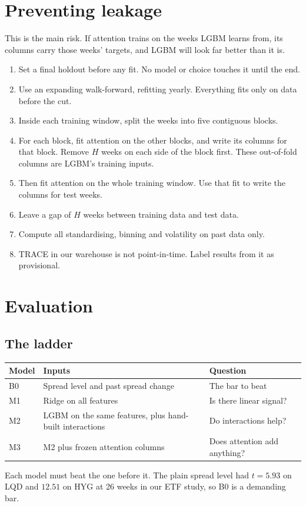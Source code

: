 \documentclass[11pt]{article}
\begin{document}
\section{Preventing leakage}
This is the main risk. If attention trains on the weeks LGBM learns from, its columns carry those weeks' targets, and LGBM will look far better than it is.

\begin{enumerate}
\item Set a final holdout before any fit. No model or choice touches it until the end.
\item Use an expanding walk-forward, refitting yearly. Everything fits only on data before the cut.
\item Inside each training window, split the weeks into five contiguous blocks.
\item For each block, fit attention on the other blocks, and write its columns for that block. Remove $H$ weeks on each side of the block first. These out-of-fold columns are LGBM's training inputs.
\item Then fit attention on the whole training window. Use that fit to write the columns for test weeks.
\item Leave a gap of $H$ weeks between training data and test data.
\item Compute all standardising, binning and volatility on past data only.
\item TRACE in our warehouse is not point-in-time. Label results from it as provisional.
\end{enumerate}

\section{Evaluation}\label{sec:eval}
\subsection{The ladder}
\begin{center}\small
\begin{tabular}{@{}lll@{}}
\toprule
Model & Inputs & Question \\
\midrule
B0 & Spread level and past spread change & The bar to beat \\
M1 & Ridge on all features & Is there linear signal? \\
M2 & LGBM on the same features, plus hand-built interactions & Do interactions help? \\
M3 & M2 plus frozen attention columns & Does attention add anything? \\
\bottomrule
\end{tabular}
\end{center}
Each model must beat the one before it. The plain spread level had $t=5.93$ on LQD and $12.51$ on HYG at 26 weeks in our ETF study, so B0 is a demanding bar.
\end{document}
